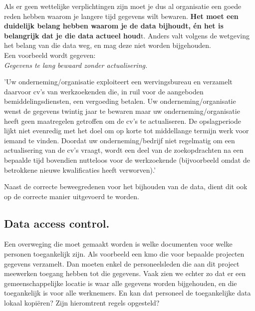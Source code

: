 Als er geen wettelijke verplichtingen zijn moet je dus al organisatie een goede reden hebben waarom je langere tijd gegevens wilt bewaren. \textbf{Het moet een duidelijk belang hebben  waarom je de data bijhoudt, én het is belangrijk dat je die data actueel houd}t. Anders valt volgens de wetgeving het belang van die data weg, en mag deze niet worden bijgehouden. 
\\ Een voorbeeld wordt gegeven: 
\\ \textit{Gegevens te lang bewaard zonder actualisering.}

\setlength{\leftskip}{1cm}
'Uw onderneming/organisatie exploiteert een wervingsbureau en verzamelt daarvoor cv's van werkzoekenden die, in ruil voor de aangeboden bemiddelingsdiensten, een vergoeding betalen. Uw onderneming/organisatie wenst de gegevens twintig jaar te bewaren maar uw onderneming/organisatie heeft geen maatregelen getroffen om de cv’s te actualiseren. De opslagperiode lijkt niet evenredig met het doel om op korte tot middellange termijn werk voor iemand te vinden. Doordat uw onderneming/bedrijf niet regelmatig om een actualisering van de cv’s vraagt, wordt een deel van de zoekopdrachten na een bepaalde tijd bovendien nutteloos voor de werkzoekende (bijvoorbeeld omdat de betrokkene nieuwe kwalificaties heeft verworven).'

\setlength{\leftskip}{0pt}

Naast de correcte beweegredenen voor het bijhouden van de data, dient dit ook op de correcte manier uitgevoerd te worden. 

\subsection{Data access control.}

Een overweging die moet gemaakt worden is welke documenten voor welke personen toegankelijk zijn. Als voorbeeld een kmo die voor bepaalde projecten gegevens verzamelt. Dan moeten enkel de personeelsleden die aan dit project meewerken toegang hebben tot die gegevens.  Vaak zien we echter zo dat er een gemeenschappelijke locatie is waar alle gegevens worden bijgehouden, en die toegankelijk is voor alle werknemers. 
En kan dat personeel de toegankelijke data lokaal kopiëren? Zijn hieromtrent regels opgesteld? 





